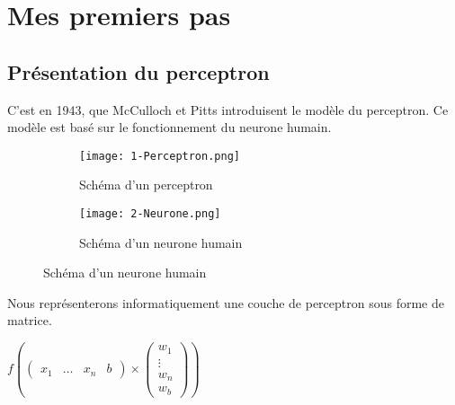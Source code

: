 \section{Mes premiers pas}
\subsection*{Présentation du perceptron}
C'est  en 1943, que McCulloch et Pitts introduisent le modèle du perceptron. Ce modèle est basé sur le fonctionnement du neurone humain.

\begin{figure}[htbp!]
    \begin{subfigure}[]{0.5\textwidth}
        \texttt{[image: 1-Perceptron.png]}
        \caption{Schéma d'un perceptron}
    \end{subfigure}
    \begin{subfigure}[]{0.5\textwidth}
        \texttt{[image: 2-Neurone.png]}
        \caption{Schéma d'un neurone humain}
    \end{subfigure}
\end{figure}

Nous représenterons informatiquement une couche de perceptron sous forme de matrice. \newline
\begin{center}
    \centering
    $
        f
        \left(
        \begin{pmatrix}
            x_1 & \ldots & x_n & b
        \end{pmatrix}
        \times
        \begin{pmatrix}
            w_1    \\
            \vdots \\
            w_n    \\
            w_b
        \end{pmatrix}
        \right)
    $ \\
\end{center}